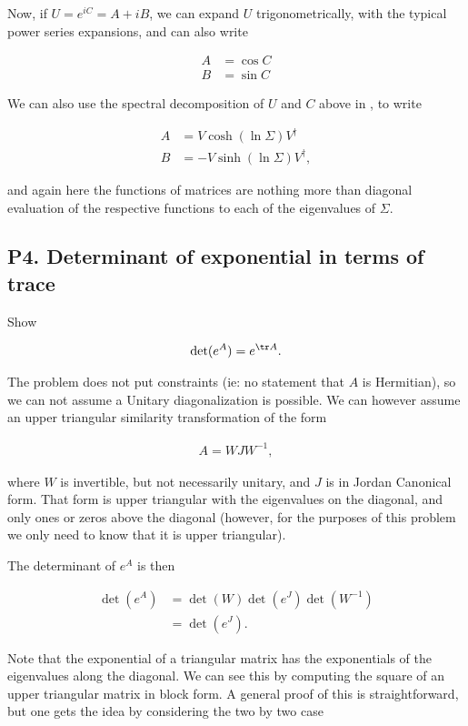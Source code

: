 Now, if $U = e^{iC} = A + iB$, we can expand $U$ trigonometrically, with the typical power series expansions, and can also write

\begin{align*}
A &= \cos C \\
B &= \sin C 
\end{align*}

We can also use the spectral decomposition of $U$ and $C$ above in , to write

\begin{align*}
A &= V \cosh(\ln \Sigma) V^\dagger \\
B &= -V \sinh(\ln \Sigma) V^\dagger,
\end{align*}

and again here the functions of matrices are nothing more than diagonal evaluation of the respective functions to each of the eigenvalues of $\Sigma$.

\subsection{P4. Determinant of exponential in terms of trace}

Show 

\begin{align*}
\det (e^A) = e^{\tr A}.
\end{align*}

The problem does not put constraints (ie: no statement that $A$ is Hermitian), so we can not assume a Unitary diagonalization is possible.  We can however assume an upper triangular similarity transformation of the form

\begin{align*}
A = W J W^{-1},
\end{align*}

where $W$ is invertible, but not necessarily unitary, and $J$ is in Jordan Canonical form.  That form is upper triangular with the eigenvalues on the diagonal, and only ones or zeros above the diagonal (however, for the purposes of this problem we only need to know that it is upper triangular).

The determinant of $e^A$ is then

\begin{align*}
\det(e^A) 
&=
\det(W) \det(e^J) \det(W^{-1}) \\
&=
\det(e^J).
\end{align*}

Note that the exponential of a triangular matrix has the exponentials of the eigenvalues along the diagonal.  We can see this by computing the square of an upper triangular matrix in block form.  A general proof of this is straightforward, but one gets the idea by considering the two by two case

